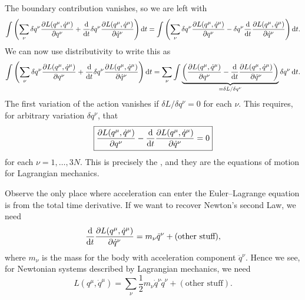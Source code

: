 The boundary contribution vanishes, so we are left with
\begin{equation}
\int \left(\sum_{\nu} \delta q^{\nu}\frac{\partial L(q^{\mu}, \dot{q}^{\mu})}{\partial q^{\nu}}
+\frac{\mathrm{d}}{\mathrm{d} t}\delta q^{\nu}\frac{\partial L(q^{\mu}, \dot{q}^{\mu})}{\partial \dot{q}^{\nu}}\right)\mathrm{d} t
=\int \left(\sum_{\nu} \delta q^{\nu}\frac{\partial L(q^{\mu}, \dot{q}^{\mu})}{\partial q^{\nu}}
-\delta q^{\nu}\frac{\mathrm{d}}{\mathrm{d} t}\frac{\partial L(q^{\mu}, \dot{q}^{\mu})}{\partial \dot{q}^{\nu}}\right)\mathrm{d} t.
\end{equation}
We can now use distributivity to write this as
\begin{equation}
\int \left(\sum_{\nu} \delta q^{\nu}\frac{\partial L(q^{\mu}, \dot{q}^{\mu})}{\partial q^{\nu}}
+\frac{\mathrm{d}}{\mathrm{d} t}\delta q^{\nu}\frac{\partial L(q^{\mu}, \dot{q}^{\mu})}{\partial \dot{q}^{\nu}}\right)\mathrm{d} t
=\sum_{\nu} \int \underbrace{\left(\frac{\partial L(q^{\mu}, \dot{q}^{\mu})}{\partial q^{\nu}}
-\frac{\mathrm{d}}{\mathrm{d} t}\frac{\partial L(q^{\mu}, \dot{q}^{\mu})}{\partial
  \dot{q}^{\nu}}\right)}_{=\delta L/\delta q^{\nu}}\delta q^{\nu}\,\mathrm{d} t.
\end{equation}
The first variation of the action vanishes if $\delta L/\delta q^{\nu}=0$ for each $\nu$.
This requires, for arbitrary variation $\delta q^{\nu}$, that
\begin{equation}
\boxed{\frac{\partial L(q^{\mu}, \dot{q}^{\mu})}{\partial q^{\nu}}
-\frac{\mathrm{d}}{\mathrm{d} t}\frac{\partial L(q^{\mu}, \dot{q}^{\mu})}{\partial \dot{q}^{\nu}}
= 0}
\end{equation}
for each $\nu=1,\dots,3N$. This is precisely the ,
and they are the equations of motion for Lagrangian mechanics.

\M
Observe the only place where acceleration can enter the Euler--Lagrange
equation is from the total time derivative. If we want to recover
Newton's second Law, we need
\begin{equation}
\frac{\mathrm{d}}{\mathrm{d} t}\frac{\partial L(q^{\mu}, \dot{q}^{\mu})}{\partial \dot{q}^{\nu}}
=m_{\nu}\ddot{q}^{\nu} + (\mbox{other stuff}),
\end{equation}
where $m_{\nu}$ is the mass for the body with acceleration component $\ddot{q}^{\nu}$.
Hence we see, for Newtonian systems described by Lagrangian mechanics,
we need
\begin{equation}
L(q^{\mu}, \dot{q}^{\mu}) =
\sum_{\nu}\frac{1}{2}m_{\nu}\dot{q}^{\nu}\dot{q}^{\nu} + (\mbox{other stuff}).
\end{equation}

